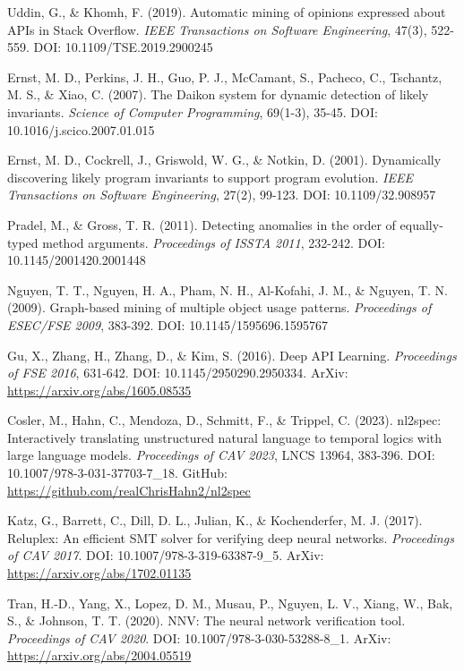 \documentclass[11pt]{article}
\begin{document}
\begin{thebibliography}{99}
Uddin, G., \& Khomh, F. (2019). Automatic mining of opinions expressed about APIs in Stack Overflow. \textit{IEEE Transactions on Software Engineering}, 47(3), 522-559. DOI: 10.1109/TSE.2019.2900245

Ernst, M. D., Perkins, J. H., Guo, P. J., McCamant, S., Pacheco, C., Tschantz, M. S., \& Xiao, C. (2007). The Daikon system for dynamic detection of likely invariants. \textit{Science of Computer Programming}, 69(1-3), 35-45. DOI: 10.1016/j.scico.2007.01.015

Ernst, M. D., Cockrell, J., Griswold, W. G., \& Notkin, D. (2001). Dynamically discovering likely program invariants to support program evolution. \textit{IEEE Transactions on Software Engineering}, 27(2), 99-123. DOI: 10.1109/32.908957

Pradel, M., \& Gross, T. R. (2011). Detecting anomalies in the order of equally-typed method arguments. \textit{Proceedings of ISSTA 2011}, 232-242. DOI: 10.1145/2001420.2001448

Nguyen, T. T., Nguyen, H. A., Pham, N. H., Al-Kofahi, J. M., \& Nguyen, T. N. (2009). Graph-based mining of multiple object usage patterns. \textit{Proceedings of ESEC/FSE 2009}, 383-392. DOI: 10.1145/1595696.1595767

Gu, X., Zhang, H., Zhang, D., \& Kim, S. (2016). Deep API Learning. \textit{Proceedings of FSE 2016}, 631-642. DOI: 10.1145/2950290.2950334. ArXiv: \url{https://arxiv.org/abs/1605.08535}

Cosler, M., Hahn, C., Mendoza, D., Schmitt, F., \& Trippel, C. (2023). nl2spec: Interactively translating unstructured natural language to temporal logics with large language models. \textit{Proceedings of CAV 2023}, LNCS 13964, 383-396. DOI: 10.1007/978-3-031-37703-7\_18. GitHub: \url{https://github.com/realChrisHahn2/nl2spec}

Katz, G., Barrett, C., Dill, D. L., Julian, K., \& Kochenderfer, M. J. (2017). Reluplex: An efficient SMT solver for verifying deep neural networks. \textit{Proceedings of CAV 2017}. DOI: 10.1007/978-3-319-63387-9\_5. ArXiv: \url{https://arxiv.org/abs/1702.01135}

Tran, H.-D., Yang, X., Lopez, D. M., Musau, P., Nguyen, L. V., Xiang, W., Bak, S., \& Johnson, T. T. (2020). NNV: The neural network verification tool. \textit{Proceedings of CAV 2020}. DOI: 10.1007/978-3-030-53288-8\_1. ArXiv: \url{https://arxiv.org/abs/2004.05519}


\end{thebibliography}
\end{document}
